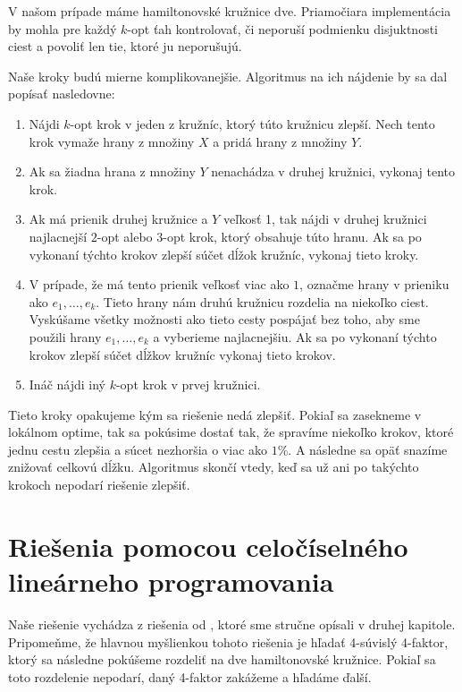 \medskip

V našom prípade máme hamiltonovské kružnice dve. Priamočiara implementácia by mohla pre každý
$k$-opt ťah kontrolovať, či neporuší podmienku disjuktnosti ciest a povoliť len tie, ktoré ju
neporušujú.

Naše kroky budú mierne komplikovanejšie. Algoritmus na ich nájdenie by sa dal popísať nasledovne:
\begin{enumerate}
\item Nájdi $k$-opt krok v jeden z kružníc, ktorý túto kružnicu zlepší. Nech tento krok vymaže hrany
z množiny $X$ a pridá hrany z množiny $Y$.
\item Ak sa žiadna hrana z množiny $Y$ nenachádza v druhej kružnici, vykonaj tento krok.
\item Ak má prienik druhej kružnice a $Y$ veľkosť 1, tak nájdi v druhej kružnici najlacnejší $2$-opt
alebo $3$-opt krok, ktorý obsahuje túto hranu. Ak sa po vykonaní týchto krokov zlepší súčet dĺžok
kružníc, vykonaj tieto kroky.
\item V prípade, že má tento prienik veľkosť viac ako $1$, označme hrany v prieniku ako $e_1, \dots,
e_k$. Tieto hrany nám druhú kružnicu rozdelia na niekoľko ciest. Vyskúšame všetky možnosti ako tieto
cesty pospájať bez toho, aby sme použili hrany $e_1, \dots, e_k$ a vyberieme najlacnejšiu. Ak sa po
vykonaní týchto krokov zlepší súčet dĺžkov kružníc vykonaj tieto krokov.
\item Ináč nájdi iný $k$-opt krok v prvej kružnici.
\end{enumerate}

Tieto kroky opakujeme kým sa riešenie nedá zlepšiť. Pokiaľ sa zasekneme v lokálnom optime, tak sa pokúsime 
dostať tak, že spravíme niekoľko krokov, ktoré jednu cestu zlepšia a súcet nezhoršia o viac ako
$1\%$. A následne sa opäť snazíme znižovať celkovú dĺžku. Algoritmus skončí vtedy, keď sa už ani
po takýchto krokoch nepodarí riešenie zlepšiť.

\section{Riešenia pomocou celočíselného lineárneho programovania}

Naše riešenie vychádza z riešenia od \cite{duchenne}, ktoré sme stručne opísali v druhej kapitole.
Pripomeňme, že hlavnou myšlienkou tohoto riešenia je hľadať 4-súvislý 4-faktor, ktorý sa následne
pokúšeme rozdeliť na dve hamiltonovské kružnice. Pokiaľ sa toto rozdelenie nepodarí, daný 4-faktor
zakážeme a hľadáme ďalší.

